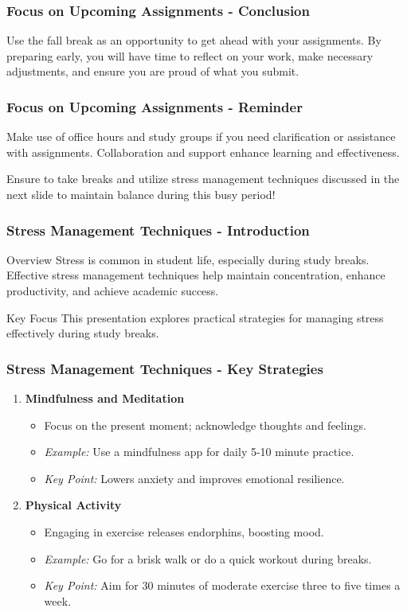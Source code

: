 \documentclass[aspectratio=169]{beamer}
\begin{document}
\begin{frame}[fragile]
    \frametitle{Focus on Upcoming Assignments - Conclusion}
    Use the fall break as an opportunity to get ahead with your assignments. By preparing early, you will have time to reflect on your work, make necessary adjustments, and ensure you are proud of what you submit.
\end{frame}

\begin{frame}[fragile]
    \frametitle{Focus on Upcoming Assignments - Reminder}
    Make use of office hours and study groups if you need clarification or assistance with assignments. Collaboration and support enhance learning and effectiveness.
    
    Ensure to take breaks and utilize stress management techniques discussed in the next slide to maintain balance during this busy period!
\end{frame}

\begin{frame}[fragile]
    \frametitle{Stress Management Techniques - Introduction}
    \begin{block}{Overview}
        Stress is common in student life, especially during study breaks. 
        Effective stress management techniques help maintain concentration, enhance productivity, and achieve academic success.
    \end{block}
    \begin{block}{Key Focus}
        This presentation explores practical strategies for managing stress effectively during study breaks.
    \end{block}
\end{frame}

\begin{frame}[fragile]
    \frametitle{Stress Management Techniques - Key Strategies}
    \begin{enumerate}
        \item \textbf{Mindfulness and Meditation}
        \begin{itemize}
            \item Focus on the present moment; acknowledge thoughts and feelings.
            \item \textit{Example:} Use a mindfulness app for daily 5-10 minute practice.
            \item \textit{Key Point:} Lowers anxiety and improves emotional resilience.
        \end{itemize}
        
        \item \textbf{Physical Activity}
        \begin{itemize}
            \item Engaging in exercise releases endorphins, boosting mood.
            \item \textit{Example:} Go for a brisk walk or do a quick workout during breaks.
            \item \textit{Key Point:} Aim for 30 minutes of moderate exercise three to five times a week.
        \end{itemize}
    \end{enumerate}
\end{frame}
\end{document}
